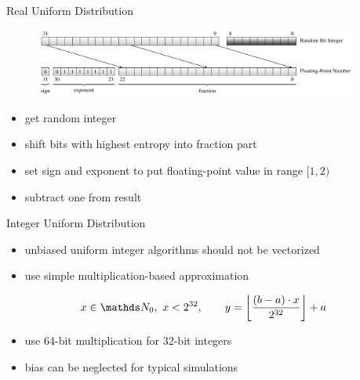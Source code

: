 \documentclass[aspectratio=169]{beamer}
\begin{document}
    \begin{frame}{Real Uniform Distribution}
      \begin{figure}
        \includegraphics[width=0.95\textwidth]{figures/uniform_implementation_scheme.pdf}
      \end{figure}
      \begin{itemize}
        \pause
        \item get random integer
        \pause
        \item shift bits with highest entropy into fraction part
        \pause
        \item set sign and exponent to put floating-point value in range $[1,2)$
        \pause
        \item subtract one from result
      \end{itemize}
    \end{frame}

    \begin{frame}{Integer Uniform Distribution}
      \begin{itemize}
        \pause
        \item unbiased uniform integer algorithms should not be vectorized
        \pause
        \item use simple multiplication-based approximation
      \end{itemize}
      \bigskip
      \begin{mybox}
        \[
          x\in\setNatural_0,\ x < 2^{32},\qquad y = \floorBrackets{\frac{(b-a)\cdot x}{2^{32}}} + a
        \]
      \end{mybox}
      \bigskip
      \begin{itemize}
        \pause
        \item use 64-bit multiplication for 32-bit integers
        \pause
        \item bias can be neglected for typical simulations
      \end{itemize}
    \end{frame}
\end{document}
